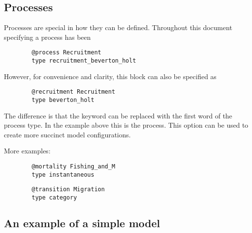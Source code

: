 \subsection{Processes}

Processes are special in how they can be defined. Throughout this document specifying a process has been

{\small{\begin{verbatim}
		@process Recruitment
		type recruitment_beverton_holt
		\end{verbatim}}}
	
However, for convenience and clarity, this block can also be specified as

{\small{\begin{verbatim}
		@recruitment Recruitment
		type beverton_holt
		\end{verbatim}}}

The difference is that the keyword  can be replaced with the first word of the process type. In the example above this is the  process. This option can be used to create more succinct model configurations.

More examples:

{\small{\begin{verbatim}
		@mortality Fishing_and_M
		type instantaneous
		\end{verbatim}}}

{\small{\begin{verbatim}
		@transition Migration
		type category
		\end{verbatim}}}

\subsection{An example of a simple model\label{example1}}




%

